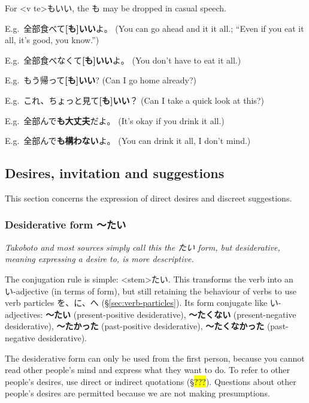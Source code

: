 \documentclass[../nihongo-gakushuu-kyouzai.tex]{subfiles}
\begin{document}
For <v te>もいい, the も may be dropped in casual speech.

E.g.\ 全部食べて\textbf{[も]いい}よ。 (You can go ahead and it it all.; ``Even if you eat it all, it's good, you know.'')

E.g.\ 全部食べなくて\textbf{[も]いい}よ。 (You don't have to eat it all.)

E.g.\ もう帰って\textbf{[も]いい}? (Can I go home already?)

E.g.\ これ、ちょっと見て\textbf{[も]いい}？ (Can I take a quick look at this?)

E.g.\ 全部んで\textbf{も大丈夫}だよ。 (It's okay if you drink it all.)

E.g.\ 全部んで\textbf{も構わない}よ。 (You can drink it all, I don't mind.)


\subsection{Desires, invitation and suggestions} \label{sec:desires-invitation-and-suggestions}
This section concerns the expression of direct desires and discreet suggestions.

\subsubsection{Desiderative form 〜たい} \label{desiderative-form}
\emph{Takoboto and most sources simply call this the たい form, but desiderative, meaning expressing a desire to, is more descriptive.}

The conjugation rule is simple: <stem>たい. This transforms the verb into an い-adjective (in terms of form), but still retaining the behaviour of verbs to use verb particles を、に、へ (\S\ref{sec:verb-particles}). Its form conjugate like い-adjectives: \textbf{〜たい} (present-positive desiderative), \textbf{〜たくない} (present-negative desiderative), \textbf{〜たかった} (past-positive desiderative), \textbf{〜たくなかった} (past-negative desiderative).


The desiderative form can only be used from the first person, because you cannot read other people's mind and express what they want to do. To refer to other people's desires, use direct or indirect quotations (\S\hl{???}). Questions about other people's desires are permitted because we are not making presumptions.
\end{document}
